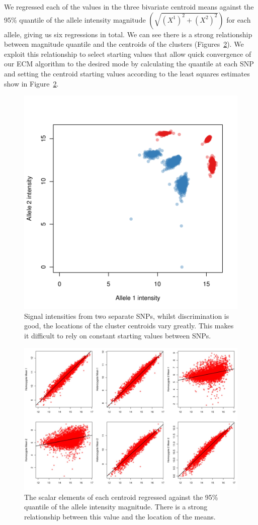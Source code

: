 We regressed each of the values in the three bivariate centroid means against the 95\% quantile of the allele intensity magnitude $\left( \sqrt{(X^1)^2+(X^2)^2} \right)$ for each allele, giving us six regressions in total.  We can see there is a strong relationship between  magnitude quantile and the centroids of the clusters (Figures~\ref{reg1}).  We exploit this relationship to select starting values that allow quick convergence of our ECM algorithm to the desired mode by calculating the quantile at each SNP and setting the centroid starting values according to the least squares estimates show in Figure~\ref{reg1}.

\begin{figure}
\centering
    \includegraphics[width=.5\textwidth]{chap2figs/SupFig1}
    \caption[Signal intensities from two SNPs with very different cluster locations]{Signal intensities from two separate SNPs, whilst discrimination is good, the locations of the cluster centroids vary greatly.  This makes it difficult to rely on constant starting values between SNPs.  \label{centroid_eg}}
\end{figure}
\clearpage

\begin{figure}
 \begin{center}  
               \includegraphics[width=\textwidth]{chap2figs/SupFig8}
\caption[Comparison between cluster centroids and maximum allele intensities]{The scalar elements of each centroid regressed against the 95\% quantile of the allele intensity magnitude. There is a strong relationship between this value and the location of the means.\label{reg1}}
\end{center} 
\end{figure}
\clearpage
